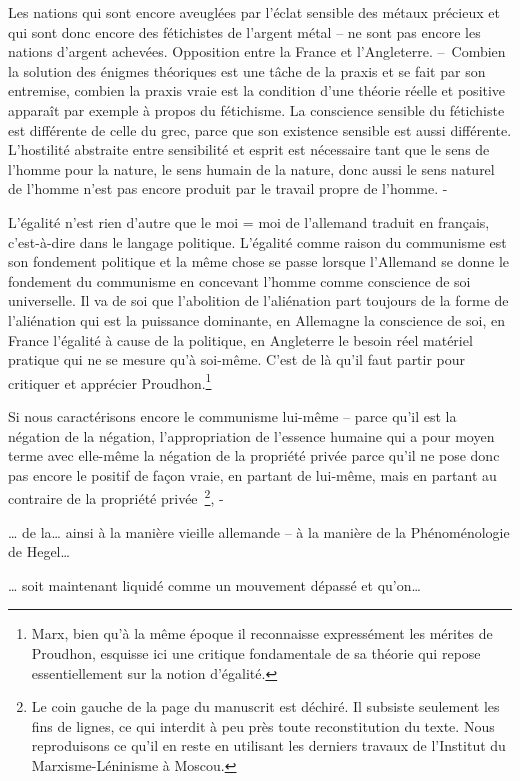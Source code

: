 \documentclass[french,twoside]{book} %
\begin{document}
Les nations qui sont encore aveuglées par l’éclat sensible des métaux précieux et qui sont donc encore des fétichistes de l’argent métal – ne sont pas encore les nations d’argent achevées. Opposition entre la France et l’Angleterre. – Combien la solution des énigmes théoriques est une tâche de la praxis et se fait par son entremise, combien la praxis vraie est la condition d’une théorie réelle et positive apparaît par exemple à propos du fétichisme. La conscience sensible du fétichiste est différente de celle du grec, parce que son existence sensible est aussi différente. L’hostilité abstraite entre sensibilité et esprit est nécessaire tant que le sens de l’homme pour la nature, le sens humain de la nature, donc aussi le sens naturel de l’homme n’est pas encore produit par le travail propre de l’homme. -\par
L’égalité n’est rien d’autre que le moi = moi de l’allemand traduit en français, c’est-à-dire dans le langage politique. L’égalité comme raison du communisme est son fondement politique et la même chose se passe lorsque l’Allemand se donne le fondement du communisme en concevant l’homme comme conscience de soi universelle. Il va de soi que l’abolition de l’aliénation part toujours de la forme de l’aliénation qui est la puissance dominante, en Allemagne la conscience de soi, en France l’égalité à cause de la politique, en Angleterre le besoin réel matériel pratique qui ne se mesure qu’à soi-même. C’est de là qu’il faut partir pour critiquer et apprécier Proudhon.\footnote{Marx, bien qu’à la même époque il reconnaisse expressément les mérites de Proudhon, esquisse ici une critique fondamentale de sa théorie qui repose essentiellement sur la notion d’égalité.}\par
Si nous caractérisons encore le communisme lui-même – parce qu’il est la négation de la négation, l’appropriation de l’essence humaine qui a pour moyen terme avec elle-même la négation de la propriété privée parce qu’il ne pose donc pas encore le positif de façon vraie, en partant de lui-même, mais en partant au contraire de la propriété privée \footnote{Le coin gauche de la page du manuscrit est déchiré. Il subsiste seulement les fins de lignes, ce qui interdit à peu près toute reconstitution du texte. Nous reproduisons ce qu’il en reste en utilisant les derniers travaux de l’Institut du Marxisme-Léninisme à Moscou.}, -\par
… de la… ainsi à la manière vieille allemande – à la manière de la Phénoménologie de Hegel…\par
… soit maintenant liquidé comme un mouvement dépassé et qu’on…\par
\end{document}
